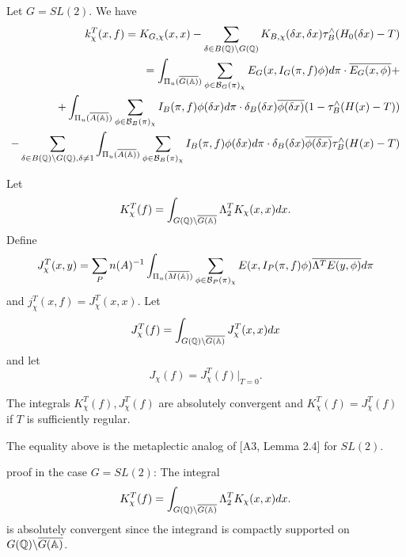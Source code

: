 \begin{example}
Let $G=SL(2)$. We have 
\begin{eqnarray*}
k_\chi ^T(x,f)
=K_{G,\chi }(x,x)-\sum_{\delta \in B(\mathbb{Q} )\backslash G(\mathbb{Q})}
K_{B,\chi }(\delta x,\delta x)
\tau _B^{\wedge }(H_0(\delta x)-T) \\
=\int_{\Pi _u(\overline{G(\mathbb{A} )})}
\sum_{\phi \in {\cal{B}}_G(\pi )_\chi}
E_G(x,I_G(\pi ,f)\phi )d\pi \cdot \overline{E_G(x,\phi )}+ \\
+\int_{\Pi _u(\overline{A(\mathbb{A} )})}
\sum_{\phi \in {\cal{B}}_B(\pi )_\chi }
I_B(\pi,f)\phi (\delta x)d\pi \cdot \delta _B(\delta x)
\overline{\phi (\delta x)}(1-\tau _B^{\wedge }(H(x)-T)) \\
-\sum_{ \delta \in B(\mathbb{Q} )\backslash G(\mathbb{Q} ), \delta \neq 1 }
\int_{\Pi _u(\overline{A(\mathbb{A} )})}
\sum_{\phi \in {\cal{B}}_B(\pi )_\chi }I_B(\pi,f)
\phi (\delta x)d\pi \cdot \delta _B(\delta x)
\overline{\phi (\delta x)}\tau _B^{\wedge }(H(x)-T)
\end{eqnarray*}
\end{example}

Let 
\begin{equation}
K_\chi ^T(f)=\int_{G(\mathbb{Q} )\backslash \overline{G(\mathbb{A} )}}
\Lambda _2^TK_\chi (x,x)dx.
\end{equation}
Define 
\begin{equation}
J_\chi ^T(x,y)=\sum_Pn(A)^{-1}
\int_{\Pi _u(\overline{M(\mathbb{A} )})}
\sum_{\phi \in {\cal{B}}_P(\pi )_\chi }
E(x,I_P(\pi ,f)\phi )\overline{\Lambda ^TE(y,\phi )}d\pi
\end{equation}
and $j_\chi ^T(x,f)=J_\chi ^T(x,x)$. Let 
\[
J_\chi ^T(f)
=\int_{G(\mathbb{Q} )\backslash \overline{G(\mathbb{A} )}}
J_\chi ^T(x,x)dx 
\]
and let
\begin{equation}
J_\chi (f)=J_\chi ^T(f)|_{T=0}.
\end{equation}

\begin{lemma}
The integrals $K_\chi ^T(f),J_\chi ^T(f)$ are absolutely convergent and $%
K_\chi ^T(f)=J_\chi ^T(f)$ if $T$ is sufficiently regular.
\end{lemma}

\begin{remark}
The equality above is the metaplectic analog of [A3, Lemma 2.4]
for $SL(2)$.
\end{remark}

proof in the case $G=SL(2)$: The integral 
\[
K_\chi ^T(f)
=\int_{G(\mathbb{Q} )\backslash \overline{G(\mathbb{A} )}}
\Lambda _2^TK_\chi (x,x)dx. 
\]
is absolutely convergent since the integrand is compactly
supported on $G(\mathbb{Q} )\backslash \overline{G(\mathbb{A} )}$.

